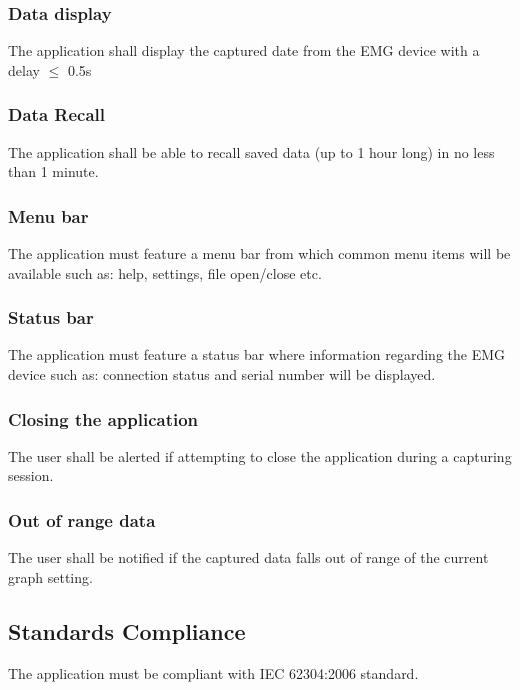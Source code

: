 \documentclass[12pt,a4paper]{article}
\begin{document}
\subsubsection{Data display}

The application shall display the captured date from the EMG device with a delay $\leq$ 0.5s

\subsubsection{Data Recall}

The application shall be able to recall saved data (up to 1 hour long) in no less than 1 minute.

\subsubsection{Menu bar}

The application must feature a menu bar from which common menu items will be available such as: help, settings, file open/close etc.

\subsubsection{Status bar}

The application must feature a status bar where information regarding the EMG device such as: connection status and serial number will be displayed.

\subsubsection{Closing the application}

The user shall be alerted if attempting to close the application during a capturing session.

\subsubsection{Out of range data}

The user shall be notified if the captured data falls out of range of the current graph setting.

\subsection{Standards Compliance}

The application must be compliant with IEC 62304:2006 standard.
\end{document}
